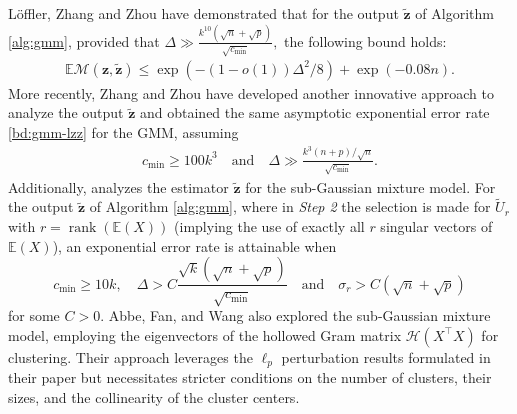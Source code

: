 \documentclass[reqno]{amsart}
\newcommand{\Cb}{\color{blue}}
\DeclareMathOperator{\rank}{rank}
\newcommand{\E}{\mathbb{E}}
\theoremstyle{plain}
\theoremstyle{definition}
\begin{document}
L{\"o}ffler, Zhang and Zhou \cite{LZZ21} have demonstrated that for the output $\widetilde{\mathbf z}$ of Algorithm \ref{alg:gmm}, provided that $\Delta \gg \frac{k^{10} (\sqrt n + \sqrt p)}{\sqrt{c_{\min}}},$ the following bound holds:  
 \begin{align}\label{bd:gmm-lzz}
 \E \mathcal M (\mathbf z, \widetilde{\mathbf z}) \le \exp \left( - (1-o(1)) \Delta^2/8 \right) + \exp(-0.08n).
 \end{align}
More recently, Zhang and Zhou \cite{ZZ22} have developed another innovative approach to analyze the output $\widetilde{\mathbf z}$ and obtained the same asymptotic exponential error rate \eqref{bd:gmm-lzz} for the GMM, assuming 
\begin{align*}
c_{\min} \ge 100 k^3 \quad\text{and} \quad \Delta\gg \frac{k^{3} (n + p)/\sqrt{n}}{\sqrt{c_{\min}}}.
\end{align*} 
Additionally, \cite[Theorem 3.1]{ZZ22} analyzes the estimator $\widetilde{\mathbf z}$ for the sub-Gaussian mixture model. For the output $\widetilde{\mathbf z}$ of Algorithm \ref{alg:gmm}, where in \emph{Step 2} the selection is made for $\widetilde{U}_r$ with $r = \rank(\E(X))$ (implying the use of exactly all $r$ singular vectors of $\E(X)$), an exponential error rate is attainable when
$$c_{\min}  \ge 10 k, \quad {\Delta}> C\frac{\sqrt{k}({\sqrt n + \sqrt p})}{\sqrt{c_{\min}}}
\quad \text{and}\quad
 {\sigma_r}> C({\sqrt n +\sqrt p})$$
 for some $C>0$. Abbe, Fan, and Wang \cite{AFW22} also explored the sub-Gaussian mixture model, employing the eigenvectors of the hollowed Gram matrix $\mathcal{H}(X^\top X)$ for clustering. Their approach leverages the $\ell_p$ perturbation results formulated in their paper but necessitates stricter conditions on the number of clusters, their sizes, and the collinearity of the cluster centers.
\end{document}
